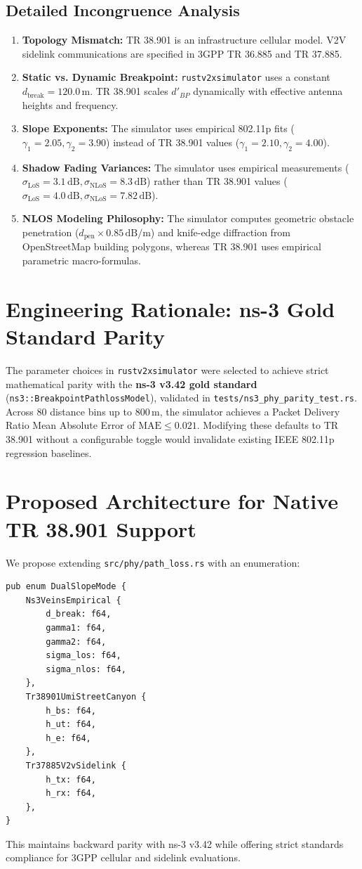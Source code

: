 \documentclass[11pt,a4paper]{article}
\begin{document}
\subsection{Detailed Incongruence Analysis}
\begin{enumerate}
    \item \textbf{Topology Mismatch:} TR 38.901 is an infrastructure cellular model. V2V sidelink communications are specified in 3GPP TR 36.885 and TR 37.885.
    \item \textbf{Static vs. Dynamic Breakpoint:} \texttt{rustv2xsimulator} uses a constant $d_{\text{break}} = 120.0\,\text{m}$. TR 38.901 scales $d'_{BP}$ dynamically with effective antenna heights and frequency.
    \item \textbf{Slope Exponents:} The simulator uses empirical 802.11p fits ($\gamma_1 = 2.05, \gamma_2 = 3.90$) instead of TR 38.901 values ($\gamma_1 = 2.10, \gamma_2 = 4.00$).
    \item \textbf{Shadow Fading Variances:} The simulator uses empirical measurements ($\sigma_{\text{LoS}} = 3.1\,\text{dB}, \sigma_{\text{NLoS}} = 8.3\,\text{dB}$) rather than TR 38.901 values ($\sigma_{\text{LoS}} = 4.0\,\text{dB}, \sigma_{\text{NLoS}} = 7.82\,\text{dB}$).
    \item \textbf{NLOS Modeling Philosophy:} The simulator computes geometric obstacle penetration ($d_{\text{pen}} \times 0.85\,\text{dB/m}$) and knife-edge diffraction from OpenStreetMap building polygons, whereas TR 38.901 uses empirical parametric macro-formulas.
\end{enumerate}

\section{Engineering Rationale: ns-3 Gold Standard Parity}
The parameter choices in \texttt{rustv2xsimulator} were selected to achieve strict mathematical parity with the \textbf{ns-3 v3.42 gold standard} (\texttt{ns3::BreakpointPathlossModel}), validated in \texttt{tests/ns3\_phy\_parity\_test.rs}. Across 80 distance bins up to $800\,\text{m}$, the simulator achieves a Packet Delivery Ratio Mean Absolute Error of $\text{MAE} \le 0.021$. Modifying these defaults to TR 38.901 without a configurable toggle would invalidate existing IEEE 802.11p regression baselines.

\section{Proposed Architecture for Native TR 38.901 Support}
We propose extending \texttt{src/phy/path\_loss.rs} with an enumeration:
\begin{verbatim}
pub enum DualSlopeMode {
    Ns3VeinsEmpirical {
        d_break: f64,
        gamma1: f64,
        gamma2: f64,
        sigma_los: f64,
        sigma_nlos: f64,
    },
    Tr38901UmiStreetCanyon {
        h_bs: f64,
        h_ut: f64,
        h_e: f64,
    },
    Tr37885V2vSidelink {
        h_tx: f64,
        h_rx: f64,
    },
}
\end{verbatim}
This maintains backward parity with ns-3 v3.42 while offering strict standards compliance for 3GPP cellular and sidelink evaluations.
\end{document}
